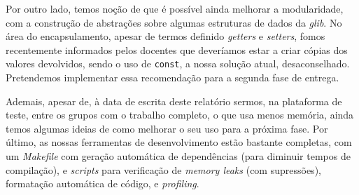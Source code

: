 \documentclass[12pt, a4paper]{article}
\begin{document}
Por outro lado, temos noção de que é possível ainda melhorar a modularidade, com a construção de
abstrações sobre algumas estruturas de dados da \emph{glib}. No área do encapsulamento, apesar de
termos definido \emph{getters} e \emph{setters}, fomos recentemente informados pelos docentes que
deveríamos estar a criar cópias dos valores devolvidos, sendo o uso de \texttt{const}, a nossa
solução atual, desaconselhado. Pretendemos implementar essa recomendação para a segunda fase de
entrega.

Ademais, apesar de, à data de escrita deste relatório sermos, na plataforma de teste, entre os
grupos com o trabalho completo, o que usa menos memória, ainda temos algumas ideias de como melhorar
o seu uso para a próxima fase. Por último, as nossas ferramentas de desenvolvimento estão bastante
completas, com um \emph{Makefile} com geração automática de dependências (para diminuir tempos de
compilação), e \emph{scripts} para verificação de \emph{memory leaks} (com supressões), formatação
automática de código, e \emph{profiling}.
\end{document}
